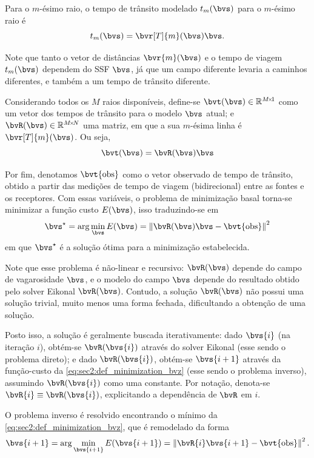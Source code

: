 Para o $m$-ésimo raio, o tempo de trânsito modelado $t_m(\bvs)$ para o $m$-ésimo raio é
\begin{equation}
	t_m(\bvs) = \bvr[T]{m}(\bvs) \bvs.
\end{equation}

Note que tanto o vetor de distâncias $\bvr{m}(\bvs)$ e o tempo de viagem $t_m(\bvs)$ dependem do SSF $\bvs$, já que um campo diferente levaria a caminhos diferentes, e também a um tempo de trânsito diferente.

Considerando todos os $M$ raios disponíveis, define-se $\bvt(\bvs) \in \re^{\sz{M}{1}}$ como um vetor dos tempos de trânsito para o modelo $\bvs$ atual; e $\bvR({\bvs}) \in \re^{\sz{M}{N}}$ uma matriz, em que a sua $m$-ésima linha é $\bvr[T]{m}(\bvs)$. Ou seja,
\begin{equation}
	\bvt(\bvs) = \bvR(\bvs) \bvs
\end{equation}

Por fim, denotamos $\bvt{\obs}$ como o vetor observado de tempo de trânsito, obtido a partir das medições de tempo de viagem (bidirecional) entre as fontes e os receptores. Com essas variáveis, o problema de minimização basal torna-se minimizar a função custo $E(\bvs)$, isso traduzindo-se em
\begin{equation}
	\opt{\bvs} = \arg\min_{\bvs} E(\bvs) = \norm{\bvR(\bvs) \bvs - \bvt{\obs}}^2
	\label{eq:sec2:def_minimization_bvz}
\end{equation}
em que $\opt{\bvs}$ é a solução ótima para a minimização estabelecida.

Note que esse problema é não-linear e recursivo: $\bvR(\bvs)$ depende do campo de vagarosidade $\bvs$, e o modelo do campo $\bvs$ depende do resultado obtido pelo solver Eikonal $\bvR(\bvs)$. Contudo, a solução $\bvR(\bvs)$ não possui uma solução trivial, muito menos uma forma fechada, dificultando a obtenção de uma solução.

Posto isso, a solução é geralmente buscada iterativamente: dado $\bvs{i}$ (na iteração $i$), obtém-se $\bvR(\bvs{i})$ através do solver Eikonal (esse sendo o \gls{problema direto}); e dado $\bvR(\bvs{i})$, obtém-se $\bvs{i+1}$ através da função-custo da \cref{eq:sec2:def_minimization_bvz} (esse sendo o \gls{problema inverso}), assumindo $\bvR(\bvs{i})$ como uma constante. Por notação, denota-se $\bvR{i} \equiv \bvR(\bvs{i})$, explicitando a dependência de $\bvR$ em $i$.

O problema inverso é resolvido encontrando o mínimo da \cref{eq:sec2:def_minimization_bvz}, que é remodelado da forma
\begin{equation}
	\bvs{i+1} = \arg\min_{\bvs{i+1}} E(\bvs{i+1}) = \norm{\bvR{i} \bvs{i+1} - \bvt{\obs}}^2 .
	\label{eq:sec2:iterative_minimization_cost-function}
\end{equation}

